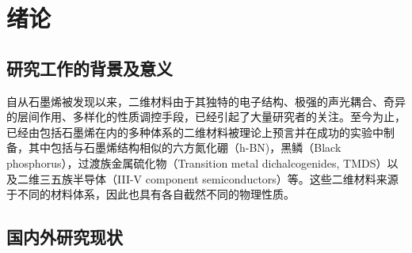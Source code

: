 \chapter{绪\hspace{6pt}论}

\section{研究工作的背景及意义}
自从石墨烯被发现以来，二维材料由于其独特的电子结构、极强的声光耦合、奇异的层间作用、多样化的性质调控手段，已经引起了大量研究者的关注。至今为止，已经由包括石墨烯在内的多种体系的二维材料被理论上预言并在成功的实验中制备，其中包括与石墨烯结构相似的六方氮化硼（h-BN)，黑鳞（Black phosphorus），过渡族金属硫化物（Transition metal dichalcogenides, TMDS）以及二维三五族半导体（III-V component semiconductors）等。这些二维材料来源于不同的材料体系，因此也具有各自截然不同的物理性质。 


\section{国内外研究现状}